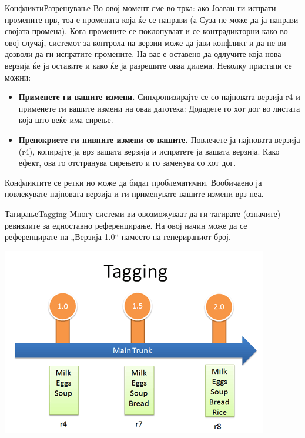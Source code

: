 \begin{frame}[shrink=10]{Конфликти}{Разрешување}
Во овој момент сме во трка: ако Јоаван ги испрати промените прв, тоа е промената
која ќе се направи (а Суза не може да ја направи својата промена).
\linebreak
Кога промените се поклопуваат и се контрадикторни како во овој случај, системот
за контрола на верзии може да јави конфликт и да не ви дозволи да ги испратите
промените. На вас е оставено да одлучите која нова верзија ќе ја оставите и како
ќе ја разрешите оваа дилема. Неколку пристапи се можни:
\begin{itemize}
  \item \textbf{Применете ги вашите измени.} Синхронизирајте се со најновата верзија r4 и
  применете ги вашите измени на оваа датотека: Додадете го хот дог во листата
  која што веќе има сирење.
  \item \textbf{Препокриете ги нивните измени со вашите.} Повлечете ја најновата
  верзија (r4), копирајте ја врз вашата верзија и испратете ја вашата верзија.
  Како ефект, ова го отстранува сирењето и го заменува со хот дог.
\end{itemize}
Конфликтите се ретки но може да бидат проблематични. Вообичаено ја повлекувате
најновата верзија и ги применувате вашите измени врз неа.
\end{frame}

\begin{frame}{Тагирање}{Tagging}
Многу системи ви овозможуваат да ги тагирате (означите) ревизиите за едноставно
референцирање. На овој начин може да се референцирате на „Верзија 1.0“ наместо
на генерираниот број.
\begin{center}
    \includegraphics[scale=0.4]{images/tagging.png}
\end{center}
\end{frame}

